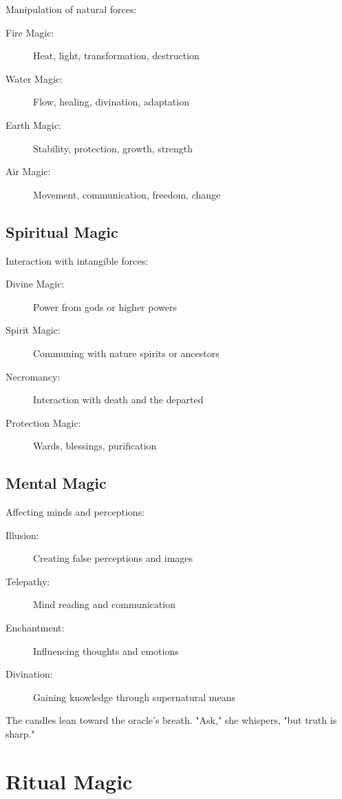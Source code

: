 \documentclass[11pt,twoside,openany]{book}
\begin{document}
Manipulation of natural forces:
\begin{description}
\item[Fire Magic:] Heat, light, transformation, destruction
\item[Water Magic:] Flow, healing, divination, adaptation
\item[Earth Magic:] Stability, protection, growth, strength
\item[Air Magic:] Movement, communication, freedom, change
\end{description}

\subsection*{Spiritual Magic}

Interaction with intangible forces:
\begin{description}
\item[Divine Magic:] Power from gods or higher powers
\item[Spirit Magic:] Communing with nature spirits or ancestors
\item[Necromancy:] Interaction with death and the departed
\item[Protection Magic:] Wards, blessings, purification
\end{description}

\subsection*{Mental Magic}

Affecting minds and perceptions:
\begin{description}
\item[Illusion:] Creating false perceptions and images
\item[Telepathy:] Mind reading and communication
\item[Enchantment:] Influencing thoughts and emotions
\item[Divination:] Gaining knowledge through supernatural means
\end{description}

\begin{tcolorbox}[colback=gray!5!white, colframe=gray!75!black, title=Vignette, fonttitle=\bfseries]
The candles lean toward the oracle's breath. "Ask," she whispers, "but truth is sharp."
\end{tcolorbox}

\section*{Ritual Magic} 
\end{document}
